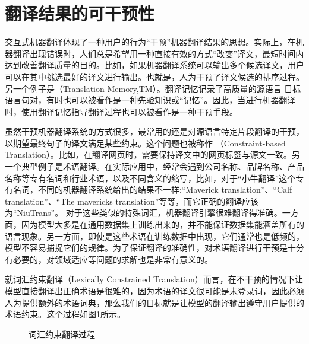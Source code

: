 
\section{翻译结果的可干预性}

\parinterval 交互式机器翻译体现了一种用户的行为“干预”机器翻译结果的思想。实际上，在机器翻译出现错误时，人们总是希望用一种直接有效的方式“改变”译文，最短时间内达到改善翻译质量的目的。比如，如果机器翻译系统可以输出多个候选译文，用户可以在其中挑选最好的译文进行输出。也就是，人为干预了译文候选的排序过程。另一个例子是{\small{}}（Translation Memory,TM）。翻译记忆记录了高质量的源语言-目标语言句对，有时也可以被看作是一种先验知识或“记忆”。因此，当进行机器翻译时，使用翻译记忆指导翻译过程也可以被看作是一种干预手段。


\parinterval 虽然干预机器翻译系统的方式很多，最常用的还是对源语言特定片段翻译的干预，以期望最终句子的译文满足某些约束。这个问题也被称作{\small{}} （Constraint-based Translation）。比如，在翻译网页时，需要保持译文中的网页标签与源文一致。另一个典型例子是术语翻译。在实际应用中，经常会遇到公司名称、品牌名称、产品名称等专有名词和行业术语，以及不同含义的缩写，比如，对于“小牛翻译”这个专有名词，不同的机器翻译系统给出的结果不一样:“Maverick translation”、“Calf translation”、“The mavericks translation”等等，而它正确的翻译应该为“NiuTrans”。 对于这些类似的特殊词汇，机器翻译引擎很难翻译得准确。一方面，因为模型大多是在通用数据集上训练出来的，并不能保证数据集能涵盖所有的语言现象。另一方面，即使是这些术语在训练数据中出现，它们通常也是低频的，模型不容易捕捉它们的规律。为了保证翻译的准确性，对术语翻译进行干预是十分有必要的，对领域适应等问题的求解也是非常有意义的。

\parinterval 就{\small\bfnew 词汇约束翻译}（Lexically Constrained Translation）而言，在不干预的情况下让模型直接翻译出正确术语是很难的，因为术语的译文很可能是未登录词，因此必须人为提供额外的术语词典，那么我们的目标就是让模型的翻译输出遵守用户提供的术语约束。这个过程如图\ref{fig:18-3}所示。
\begin{figure}[htp]
\centering

\caption{词汇约束翻译过程}
\label{fig:18-3}
\end{figure}

